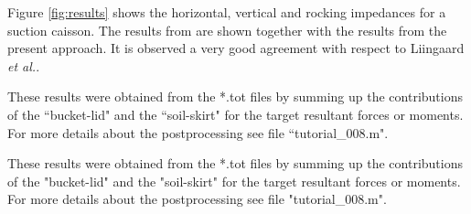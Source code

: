 \documentclass[a4]{article}
\begin{document}
Figure \ref{fig:results} shows the horizontal, vertical and rocking impedances for a suction caisson. The results from \cite{liingaard} are shown together with the results from the present approach. It is observed a very good agreement with respect to Liingaard \textit{et al.}. 


These results were obtained from the *.tot files by summing up the contributions of the ``bucket-lid" and the ``soil-skirt" for the target resultant forces or moments. For more details about the postprocessing see file ``tutorial\_008.m".

These results were obtained from the *.tot files by summing up the contributions of the "bucket-lid" and the "soil-skirt" for the target resultant forces or moments. For more details about the postprocessing see file "tutorial\_008.m".
\end{document}
